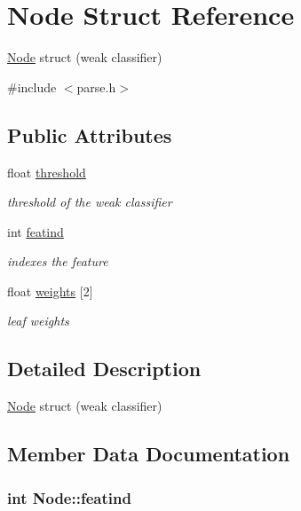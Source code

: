 \hypertarget{structNode}{}\section{Node Struct Reference}
\label{structNode}


\hyperlink{structNode}{Node} struct (weak classifier)  




{\ttfamily \#include $<$parse.\+h$>$}

\subsection*{Public Attributes}
\begin{DoxyCompactItemize}
\item 
float \hyperlink{structNode_adb3dcfc278000adc4432b6276457e567}{threshold}
\begin{DoxyCompactList}\small\item\em threshold of the weak classifier \end{DoxyCompactList}\item 
int \hyperlink{structNode_a3d9d38f28d4189baca16be81aa48cdc3}{featind}
\begin{DoxyCompactList}\small\item\em indexes the feature \end{DoxyCompactList}\item 
float \hyperlink{structNode_a0bce4167171403b9ed22eb4f26687333}{weights} \mbox{[}2\mbox{]}
\begin{DoxyCompactList}\small\item\em leaf weights \end{DoxyCompactList}\end{DoxyCompactItemize}


\subsection{Detailed Description}
\hyperlink{structNode}{Node} struct (weak classifier) 

\subsection{Member Data Documentation}
\hypertarget{structNode_a3d9d38f28d4189baca16be81aa48cdc3}{}
\subsubsection[{featind}]{\setlength{\rightskip}{0pt plus 5cm}int Node\+::featind}\label{structNode_a3d9d38f28d4189baca16be81aa48cdc3}


